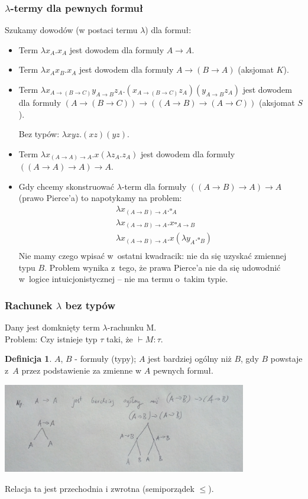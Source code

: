 \documentclass[10pt,a4paper]{article}
\theoremstyle{plain}
\theoremstyle{definition}
\newtheorem*{definition}{Definicja}
\newcommand{\impl}{\rightarrow}
\begin{document}
\subsubsection{$\lambda$-termy dla pewnych formuł}
Szukamy dowodów (w postaci termu $\lambda$) dla formuł:
\begin{itemize}
  \item Term $\lambda x_A . x_A$ jest dowodem dla formuły $A \impl A$.
  \item Term $\lambda x_A x_B . x_A$ jest dowodem dla formuły
    $A \impl (B \impl A)$ (aksjomat $K$).
  \item Term $\lambda x_{A\impl (B\impl C)} y_{A\impl B} z_A
    .(x_{A\impl (B\impl C)}z_{A})(y_{A\impl B}z_{A})$ jest dowodem dla formuły
    $(A \impl (B \impl C))\impl ((A \impl B) \impl (A \impl C))$
    (aksjomat $S$).

    Bez typów: $\lambda xyz . (xz)(yz)$.
  \item Term $\lambda x_{(A\impl A)\impl A} . x (\lambda z_A . z_A)$ jest
    dowodem dla formuły $((A\impl A)\impl A)\impl A$.
  \item Gdy chcemy skonstruować $\lambda$-term dla formuły
    $((A \impl B)\impl A) \impl A$ (prawo Pierce'a) to napotykamy na problem:
    \begin{align*}
      &\lambda x_{(A \impl B) \impl A}. \square_{A} \\
      &\lambda x_{(A \impl B) \impl A}. x \square_{A\impl B} \\
      &\lambda x_{(A \impl B) \impl A}. x(\lambda y_{A}. \square_{B}) \\
    \end{align*}
    Nie mamy czego wpisać w~ostatni kwadracik: nie da się uzyskać zmiennej typu
    $B$. Problem wynika z~tego, że prawa Pierce'a nie da się udowodnić w~logice
    intuicjonistycznej -- nie ma termu o~takim typie.
\end{itemize}
\subsubsection{Rachunek $\lambda$ bez typów}
Dany jest domknięty term $\lambda$-rachunku M.\\
Problem: Czy istnieje typ $\tau$ taki, że $\vdash M : \tau$.
\begin{definition}
$A$, $B$ - formuły (typy); $A$ jest bardziej ogólny niż $B$, gdy $B$ powstaje
z~$A$ przez podstawienie za zmienne w $A$ pewnych formuł.
\begin{center}
\includegraphics[width=0.8\textwidth]{img/podstawienieZmiennych}
\end{center}
Relacja ta jest przechodnia i zwrotna (semiporządek $\leq$).
\end{definition}
\end{document}
